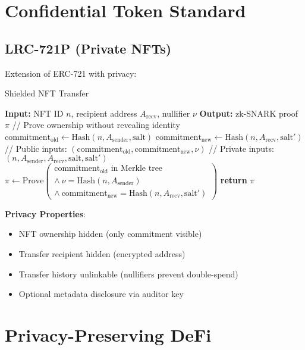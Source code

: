 \documentclass[11pt]{article}
\begin{document}
\section{Confidential Token Standard}

\subsection{LRC-721P (Private NFTs)}

Extension of ERC-721 with privacy:

\begin{algorithm}[H]
\caption{Shielded NFT Transfer}
\begin{algorithmic}[1]
\State \textbf{Input:} NFT ID $n$, recipient address $A_{\text{recv}}$, nullifier $\nu$
\State \textbf{Output:} zk-SNARK proof $\pi$
\State
\State // Prove ownership without revealing identity
\State $\text{commitment}_{\text{old}} \leftarrow \text{Hash}(n, A_{\text{sender}}, \text{salt})$
\State $\text{commitment}_{\text{new}} \leftarrow \text{Hash}(n, A_{\text{recv}}, \text{salt}')$
\State
\State // Public inputs: $(\text{commitment}_{\text{old}}, \text{commitment}_{\text{new}}, \nu)$
\State // Private inputs: $(n, A_{\text{sender}}, A_{\text{recv}}, \text{salt}, \text{salt}')$
\State
\State $\pi \leftarrow \text{Prove}\left(\begin{array}{l}
  \text{commitment}_{\text{old}} \text{ in Merkle tree} \\
  \land \ \nu = \text{Hash}(n, A_{\text{sender}}) \\
  \land \ \text{commitment}_{\text{new}} = \text{Hash}(n, A_{\text{recv}}, \text{salt}')
\end{array}\right)$
\State \textbf{return} $\pi$
\end{algorithmic}
\end{algorithm}

\textbf{Privacy Properties}:
\begin{itemize}[leftmargin=1.1em]
  \item NFT ownership hidden (only commitment visible)
  \item Transfer recipient hidden (encrypted address)
  \item Transfer history unlinkable (nullifiers prevent double-spend)
  \item Optional metadata disclosure via auditor key
\end{itemize}

\section{Privacy-Preserving DeFi}
\end{document}
